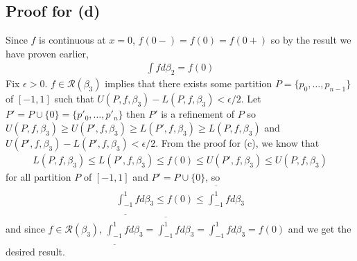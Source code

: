 \documentclass{scrartcl}
\begin{document}
\subsection{Proof for (d)}
Since \(f\) is continuous at \(x = 0\), \(f(0-) = f(0) = f(0+)\) so by the result we have proven earlier,
\begin{align*}
  \int f d\beta_2 = f(0)
\end{align*}
Fix \(\epsilon > 0\).
\(f \in \mathscr{R}(\beta_3)\) implies that there exists some partition \(P = \{p_0, \dots, p_{n - 1}\}\) of \([-1, 1]\) such that \(U(P, f, \beta_3) - L(P, f, \beta_3) < \epsilon / 2\). Let \(P' = P \cup \{0\} = \{p'_0, \dots, p'_n\}\) then \(P'\) is a refinement of \(P\) so \(U(P, f, \beta_3) \geq U(P', f, \beta_3) \geq L(P', f, \beta_3) \geq L(P, f, \beta_3)\) and \(U(P', f, \beta_3) - L(P', f, \beta_3) < \epsilon / 2\).
From the proof for (c), we know that
\begin{align*}
  L(P, f, \beta_3) \leq L(P', f, \beta_3) \leq f(0) \leq U(P', f, \beta_3) \leq U(P, f, \beta_3)
\end{align*}
for all partition \(P\) of \([-1, 1]\) and \(P' = P \cup \{0\}\), so
\begin{align*}
  \underline{\int^1_{-1}} f d\beta_3 \leq f(0) \leq \overline{\int^1_{-1}} f d\beta_3
\end{align*}
and since \(f \in \mathscr{R}(\beta_3)\), \(\underline{\int^1_{-1}} f d\beta_3 = \overline{\int^1_{-1}} f d\beta_3 = \int^1_{-1} f d\beta_3 = f(0)\) and we get the desired result.
\end{document}

